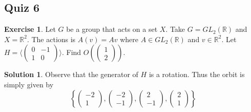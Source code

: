 \documentclass[12pt]{article}
\theoremstyle{definition}
\newcommand{\R}{\mathbb{R}}
\newtheorem{exercise}{\color{YellowOrange}Exercise}
\theoremstyle{definition}
\newtheorem{solution}{\color{Goldenrod}Solution}
\begin{document}
\subsection{Quiz 6}
\begin{exercise}
	Let $G$ be a group that acts on a set $X$. Take $G = GL_2(\R)$ and $X = \R^2$. The actions is $A(v) = Av$ where $A \in GL_2(\R)$ and $v \in \R^2$. Let $H = \langle \begin{pmatrix} 0 & -1 \\ 1 & 0 \end{pmatrix} \rangle$. Find $O\left(\begin{pmatrix} 1 \\2 \end{pmatrix}\right)$.
\end{exercise}
\begin{solution}
	Observe that the generator of $H$ is a rotation. Thus the orbit is simply given by
	\begin{equation}
		\left\{\begin{pmatrix}-2 \\ 1 \end{pmatrix}, \begin{pmatrix}-2 \\ -1 \end{pmatrix}, \begin{pmatrix}2 \\ -1 \end{pmatrix}, \begin{pmatrix}2 \\ 1 \end{pmatrix}\right\}
	\end{equation}
\end{solution}
\end{document}
